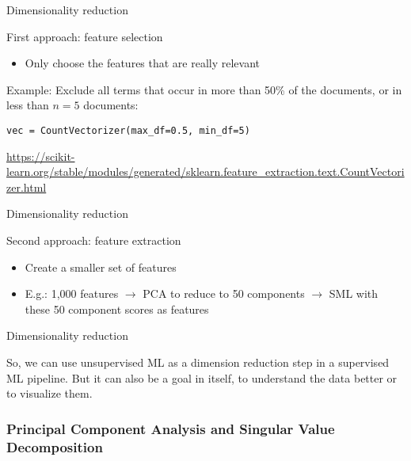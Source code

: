 \begin{frame}[fragile]{Dimensionality reduction}

\begin{block}{First approach: feature selection}
\begin{itemize}
\item Only choose the features that are really relevant
\end{itemize}
\end{block}


Example: Exclude all terms that occur in more than 50\% of the documents, or in less than $n=5$ documents:

\begin{lstlisting}
vec = CountVectorizer(max_df=0.5, min_df=5)
\end{lstlisting}

\tiny{\url{https://scikit-learn.org/stable/modules/generated/sklearn.feature\_extraction.text.CountVectorizer.html}}

\end{frame}





\begin{frame}[fragile]{Dimensionality reduction}

\begin{block}{Second approach: feature extraction}
\begin{itemize}
\item Create a smaller set of features
\item E.g.: 1,000 features $\rightarrow$ PCA to reduce to 50 components $\rightarrow$ SML with these 50 component scores as features
\end{itemize}
\end{block}

\end{frame}



\begin{frame}[fragile]{Dimensionality reduction}

So, we can use unsupervised ML as a dimension reduction step in a supervised ML pipeline. 
\vspace{0.5cm}
But it can also be a goal in itself, to understand the data better or to visualize them.
\end{frame}







\subsubsection{Principal Component Analysis and Singular Value Decomposition}


